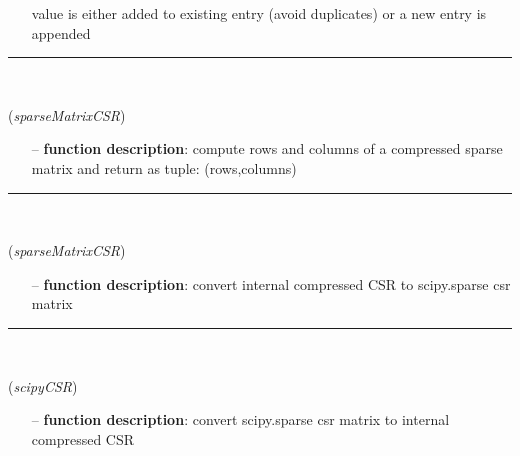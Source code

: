 \begin{itemize}[leftmargin=1.4cm]
\begin{itemize}[leftmargin=0.5cm]
\begin{itemize}[leftmargin=1.4cm]
\begin{itemize}[leftmargin=1.4cm]
\begin{itemize}[leftmargin=0.5cm]
\begin{itemize}[leftmargin=0.7cm]
\begin{itemize}[leftmargin=1.2cm]
    \item[] value is either added to existing entry (avoid duplicates) or a new entry is appended
  \end{itemize}
\vspace{12pt}\end{itemize}
%
\noindent\rule{8cm}{0.75pt}\vspace{1pt} \\ 
\begin{flushleft}
\label{sec:FEM:CSRtoRowsAndColumns}
({\it sparseMatrixCSR})
\end{flushleft}
\setlength{\itemindent}{0.7cm}
\begin{itemize}[leftmargin=0.7cm]
  \item[--]  {\bf function description}: compute rows and columns of a compressed sparse matrix and return as tuple: (rows,columns)\vspace{12pt}\end{itemize}
%
\noindent\rule{8cm}{0.75pt}\vspace{1pt} \\ 
\begin{flushleft}
\label{sec:FEM:CSRtoScipySparseCSR}
({\it sparseMatrixCSR})
\end{flushleft}
\setlength{\itemindent}{0.7cm}
\begin{itemize}[leftmargin=0.7cm]
  \item[--]  {\bf function description}: convert internal compressed CSR to scipy.sparse csr matrix\vspace{12pt}\end{itemize}
%
\noindent\rule{8cm}{0.75pt}\vspace{1pt} \\ 
\begin{flushleft}
\label{sec:FEM:ScipySparseCSRtoCSR}
({\it scipyCSR})
\end{flushleft}
\setlength{\itemindent}{0.7cm}
\begin{itemize}[leftmargin=0.7cm]
  \item[--]  {\bf function description}: convert scipy.sparse csr matrix to internal compressed CSR\vspace{12pt}\end{itemize}

\end{itemize}
\end{itemize}
\end{itemize}
\end{itemize}
\end{itemize}
